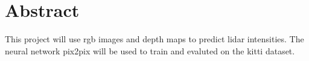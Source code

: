 \section*{Abstract}
This project will use rgb images and depth maps to predict lidar intensities. The neural network pix2pix will be used to train and evaluted on the kitti dataset. 
